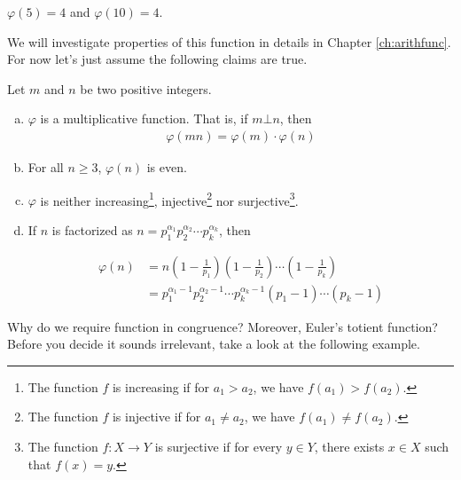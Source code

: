 \documentclass{subfile}
\begin{document}
	\begin{example}
		$\varphi(5)=4$ and $\varphi(10)=4$.
	\end{example}

	We will investigate properties of this function in details in Chapter \ref{ch:arithfunc}. For now let's just assume the following claims are true.
	\begin{proposition}\label{prop:phiproperties}
		Let $m$ and $n$ be two positive integers.
		\begin{enumerate}[(a)]
			\item $\varphi$ is a multiplicative function. That is, if $m \bot n$, then
			\begin{align*}
				\varphi(mn)=\varphi(m) \cdot \varphi (n)
			\end{align*}
			\item For all $n \geq 3$, $\varphi(n)$ is even.
			\item $\varphi$ is neither increasing\footnote{The function $f$ is increasing if for $a_1 >a_2$, we have  $f(a_1) > f(a_2)$.}, injective\footnote{The function $f$ is injective if for $a_1 \neq a_2$, we have $f(a_1) \neq f(a_2)$.} nor surjective\footnote{The function $f:X \to Y$ is surjective if for every $y \in Y$, there exists $x \in X$ such that $f(x)=y$.}.
			\item If $n$ is factorized as $n= p_1^{\alpha_1} p_2^{\alpha_2} \cdots p_k^{\alpha_k}$, then

			\begin{align*}
				\varphi(n) & =n \left( 1 - \frac{1}{p_1} \right)  \left( 1 - \frac{1}{p_2} \right)  \cdots \left( 1 - \frac{1}{p_k} \right)  \\
				& = p_1^{\alpha_1-1} p_2^{\alpha_2-1} \cdots p_k^{\alpha_k-1} \left( p_1 -1 \right) \cdots \left( p_k -1 \right)
			\end{align*}

		\end{enumerate}
	\end{proposition}


	Why do we require function in congruence? Moreover, Euler's totient function? Before you decide it sounds irrelevant, take a look at the following example.
\end{document}
